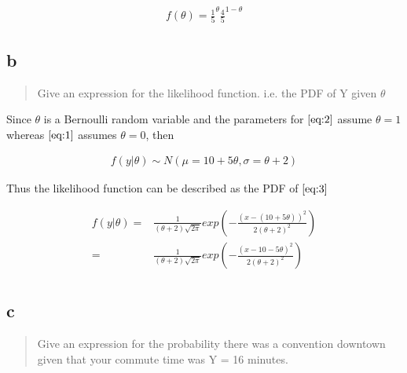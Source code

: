 \documentclass[11pt]{article}
\begin{document}
\begin{equation}
\begin{split}
f(\theta) = \frac{1}{5}^{\theta} \frac{4}{5}^{1 - \theta}
\end{split}
\end{equation}

\subsection{b}
\label{sec:org50d0a21}

\begin{quote}
Give an expression for the likelihood function. i.e. the PDF of Y given \(\theta\)
\end{quote}

Since \(\theta\) is a Bernoulli random variable and the parameters for
\(\eqref{eq:2}\) assume \(\theta = 1\) whereas \(\eqref{eq:1}\) assumes \(\theta = 0\),
then

\begin{equation}
\begin{split}
f(y | \theta) \sim N (\mu = 10 + 5 \theta, \sigma = \theta + 2) \label{eq:3}
\end{split}
\end{equation}


Thus the likelihood function can be described as the PDF of \(\eqref{eq:3}\)

\begin{equation}
\begin{split}
f(y | \theta) = & \frac{1}{(\theta + 2) \sqrt{2 \pi}} exp(- \frac{(x - (10 + 5 \theta))^2}{2(\theta + 2)^2})\\
= & \frac{1}{(\theta + 2) \sqrt{2 \pi}} exp(- \frac{(x - 10 - 5 \theta)^2}{2(\theta + 2)^2})\\
\end{split}
\end{equation}

\subsection{c}
\label{sec:org788da55}

\begin{quote}
Give an expression for the probability there was a convention downtown given
that your commute time was Y = 16 minutes.
\end{quote}
\end{document}
